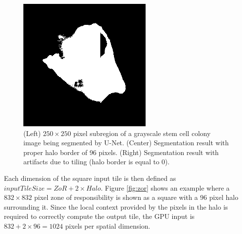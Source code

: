 \documentclass[10pt, indentfirst]{article}
\begin{document}
\begin{figure}
\begin{minipage}{0.32\columnwidth}
	\end{minipage}
	\begin{minipage}{0.32\columnwidth}
		\includegraphics[width=\columnwidth]{figs/no_halo.png}
	\end{minipage}
	\caption{(Left) $250 \times 250$ pixel subregion of a grayscale stem cell colony image being segmented by U-Net.
		(Center) Segmentation result with proper halo border of 96 pixels.
		(Right) Segmentation result with artifacts due to tiling (halo border is equal to $0$).} 
	\label{fig:nohalo}
\end{figure}

Each dimension of the square input tile is then defined as $inputTileSize = ZoR + 2 \times Halo$.
Figure \ref{fig:zor} shows an example where a $832 \times 832$ pixel zone of responsibility is shown as a square with a $96$ pixel halo surrounding it.
Since the local context provided by the pixels in the halo is required to correctly compute the output tile, the GPU input is $832 + 2 \times 96 = 1024$ pixels per spatial dimension.
\end{document}
